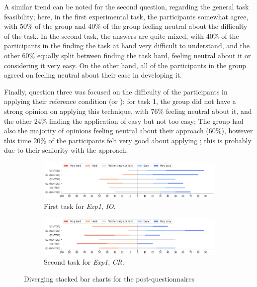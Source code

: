 A similar trend can be noted for the second question, regarding the general task feasibility; here, in the first experimental task, the participants somewhat agree, with 50\% of the \tdd group and 40\% of the \notdd group feeling neutral about the difficulty of the task. In the second task, the answers are quite mixed, with 40\% of the participants in the \tdd finding the task at hand very difficult to understand, and the other 60\% equally split between finding the task hard, feeling neutral about it or considering it very easy.  On the other hand, all of the participants in the \notdd group agreed on feeling neutral about their ease in developing it.

Finally, question three was focused on the difficulty of the participants in applying their reference condition (\ie \tdd or \notdd): for task 1, the \tdd group did not have a strong opinion on applying this technique, with 76\% feeling neutral about it, and the other 24\% finding the application of \tdd easy but not too easy; The \notdd group had also the majority of opinions feeling neutral about their approach (60\%), however this time 20\% of the participants felt very good about applying \notdd; this is probably due to their seniority with the approach.


\begin{figure}[htbp]
    \begin{subfigure}{\textwidth}
        \includegraphics[width=\textwidth]{figures/bar_charts/task1.png}
        \caption{First task for \textit{Exp1}, \textit{IO}.}
    \end{subfigure}
    
    \bigskip
    
    \begin{subfigure}{\textwidth}
        \includegraphics[width=\textwidth]{figures/bar_charts/task2.png}
        \caption{Second task for \textit{Exp1}, \textit{CR}.}
    \end{subfigure}
    
    \caption{Diverging stacked bar charts for the post-questionnaires}
    \label{bar_charts}
\end{figure}

